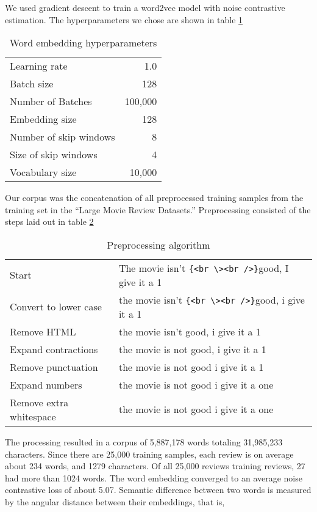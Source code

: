 We used gradient descent to train a word2vec model with noise contrastive estimation.  The hyperparameters we chose are shown in table \ref{tab:embedding_hperparameters}

\begin{table}[h]
\centering
\begin{tabular}{ l | r }
    \hline
    Learning rate & 1.0 \\
    Batch size & 128 \\
    Number of Batches & 100,000 \\
    Embedding size & 128 \\
    Number of skip windows & 8 \\
    Size of skip windows & 4 \\
    Vocabulary size & 10,000 \\
    \hline
\end{tabular}
\caption{Word embedding hyperparameters}
\label{tab:embedding_hperparameters}
\end{table}

Our corpus was the concatenation of all preprocessed training samples from the training set in the ``Large Movie Review Datasets.'' \cite{am11}  Preprocessing consisted of the steps laid out in table \ref{tab:preproc}

\begin{table}[h]
\centering
\begin{tabular}{ l | l }
    \hline
    Start & The movie isn't \verb|{<br \><br />}|good, I give it a 1\\
    Convert to lower case & the movie isn't \verb|{<br \><br />}|good, i give it a 1\\
    Remove HTML & the movie isn't \space good, i give it a 1\\
    Expand contractions & the movie is not \space good, i give it a 1\\
    Remove punctuation & the movie is not \space good i give it a 1\\
    Expand numbers & the movie is not \space good i give it a one\\
    Remove extra whitespace & the movie is not good i give it a one\\
    \hline
\end{tabular}
\caption{Preprocessing algorithm}
\label{tab:preproc}
\end{table}

The processing resulted in a corpus of 5,887,178 words totaling 31,985,233 characters.  Since there are 25,000 training samples, each review is on average about 234 words, and 1279 characters.  Of all 25,000 reviews training reviews, 27 had more than 1024 words.  The word embedding converged to an average noise contrastive loss of about 5.07.   Semantic difference between two words is measured by the angular distance between their embeddings, that is,

